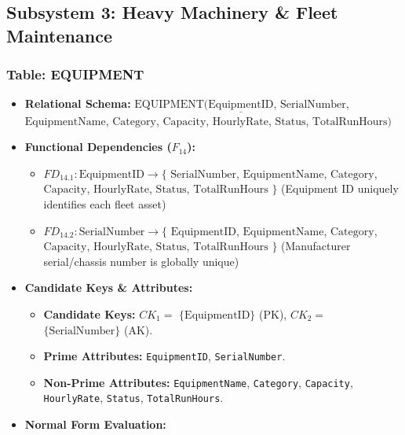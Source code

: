 \documentclass[a4paper,12pt]{report}
\begin{document}
\subsection{Subsystem 3: Heavy Machinery \& Fleet Maintenance}\label{subsystem-3-heavy-machinery-fleet-maintenance}

\subsubsection{Table: EQUIPMENT}\label{table-equipment}

\begin{itemize}
\item
  \textbf{Relational Schema:} \(\text{EQUIPMENT}(\underline{\text{EquipmentID}}\), \(\text{SerialNumber}\), \(\text{EquipmentName}\), \(\text{Category}\), \(\text{Capacity}\), \(\text{HourlyRate}\), \(\text{Status}\), \(\text{TotalRunHours})\)
\item
  \textbf{Functional Dependencies (\(F_{14}\)):}

  \begin{itemize}
  \item
    \(FD_{14.1}: \text{EquipmentID} \rightarrow \{\) \(\text{SerialNumber}\), \(\text{EquipmentName}\), \(\text{Category}\), \(\text{Capacity}\), \(\text{HourlyRate}\), \(\text{Status}\), \(\text{TotalRunHours}\) \(\}\) (Equipment ID uniquely identifies each fleet asset)
  \item
    \(FD_{14.2}: \text{SerialNumber} \rightarrow \{\) \(\text{EquipmentID}\), \(\text{EquipmentName}\), \(\text{Category}\), \(\text{Capacity}\), \(\text{HourlyRate}\), \(\text{Status}\), \(\text{TotalRunHours}\) \(\}\) (Manufacturer serial/chassis number is globally unique)
  \end{itemize}
\item
  \textbf{Candidate Keys \& Attributes:}

  \begin{itemize}
  \item
    \textbf{Candidate Keys:} \(CK_{1} =\) \(\{\text{EquipmentID}\}\) (PK), \(CK_{2} =\) \(\{\text{SerialNumber}\}\) (AK).
  \item
    \textbf{Prime Attributes:} \texttt{EquipmentID}, \texttt{SerialNumber}.
  \item
    \textbf{Non-Prime Attributes:} \texttt{EquipmentName}, \texttt{Category}, \texttt{Capacity}, \texttt{HourlyRate}, \texttt{Status}, \texttt{TotalRunHours}.
  \end{itemize}
\item
  \textbf{Normal Form Evaluation:}


\end{itemize}
\end{document}
